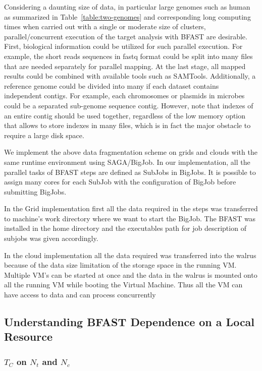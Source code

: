 \documentclass[12pt]{article}
\begin{document}
Considering a daunting size of data, in particular large genomes such as human as summarized in Table~\ref{table:two-genomes} and corresponding long computing times when carried out with a single or moderate size of clusters, parallel/concurrent execution of the target analysis with BFAST are desirable.  First, biological information could be utilized for such parallel execution. For example, the short reads sequences in fastq format could be split into many files that are needed separately for parallel mapping.  At the last stage, all mapped results could be combined with available tools such as SAMTools\cite{samtools}.   Additionally, a reference genome could be divided into many if each dataset contains independent contigs.  For example, each chromosomes or plasmids in microbes could be a separated sub-genome sequence contig.  However, note that indexes of an entire contig should be used together, regardless of the low memory option that allows to store indexes in many files, which is in fact the major obstacle to require a large disk space.

We implement the above data fragmentation scheme on grids and clouds with the same runtime environment using SAGA/BigJob\cite{saga-royalsoc,saga-ccgrid10, ecmls10}.  In our implementation, all the parallel tasks of BFAST steps are defined as SubJobs in BigJobs.  It is possible to assign many cores for each SubJob with the configuration of BigJob before submitting BigJobs. 
  
In the Grid implementation first all the data required in the steps was transferred to machine's  work 
directory where we want to start the BigJob. The BFAST was installed in the home directory and the
executables path for job description of subjobs was given accordingly.

In the cloud implementation all the data required was transferred into the walrus because of the data size limitation of the storage space in the
running VM. Multiple VM's can be started at once and the data in the walrus is mounted onto all the running VM
while booting the Virtual Machine. Thus all the VM can have access to data and can process concurrently


\subsection{Understanding BFAST Dependence on a Local Resource}

\subsubsection{$T_{C}$ on $N_t$ and $N_c$}
\end{document}
